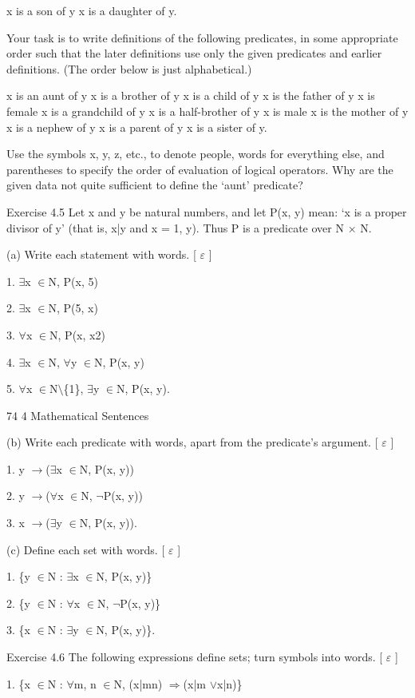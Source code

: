 \documentclass[11pt]{article}
\theoremstyle{plain}
\theoremstyle{definition}
\begin{document}
x is a son of y x is a daughter of y.

Your task is to write definitions of the following predicates, in some appropriate order such that the later definitions use only the given predicates and earlier definitions. (The order below is just alphabetical.)

x is an aunt of y x is a brother of y x is a child of y x is the father of y x is female x is a grandchild of y x is a half-brother of y x is male x is the mother of y x is a nephew of y x is a parent of y x is a sister of y.

Use the symbols x, y, z, etc., to denote people, words for everything else, and parentheses to specify the order of evaluation of logical operators. Why are the given data not quite sufficient to define the `aunt' predicate?

Exercise 4.5 Let x and y be natural numbers, and let P(x, y) mean: `x is a proper divisor of y' (that is, x|y and x = 1, y). Thus P is a predicate over N $\times$ N.

(a) Write each statement with words. [ $\varepsilon$ ]

1. $\exists$x $\in$N, P(x, 5)

2. $\exists$x $\in$N, P(5, x)

3. $\forall$x $\in$N, P(x, x2)

4. $\exists$x $\in$N, $\forall$y $\in$N, P(x, y)

5. $\forall$x $\in$N$\setminus$\{1\}, $\exists$y $\in$N, P(x, y).

74 4 Mathematical Sentences

(b) Write each predicate with words, apart from the predicate's argument. [ $\varepsilon$ ]

1. y $\to$($\exists$x $\in$N, P(x, y))

2. y $\to$($\forall$x $\in$N, $\neg$P(x, y))

3. x $\to$($\exists$y $\in$N, P(x, y)).

(c) Define each set with words. [ $\varepsilon$ ]

1. \{y $\in$N : $\exists$x $\in$N, P(x, y)\}

2. \{y $\in$N : $\forall$x $\in$N, $\neg$P(x, y)\}

3. \{x $\in$N : $\exists$y $\in$N, P(x, y)\}.

Exercise 4.6 The following expressions define sets; turn symbols into words. [ $\varepsilon$ ]

1. \{x $\in$N : $\forall$m, n $\in$N, (x|mn) $\Rightarrow$(x|m $\lor$x|n)\}
\end{document}
